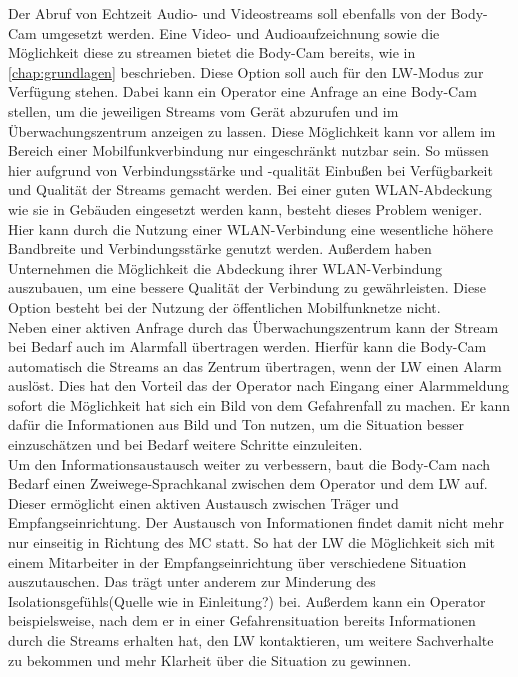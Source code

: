 \documentclass[thesis.tex]{subfiles}
\begin{document}
Der Abruf von Echtzeit Audio- und Videostreams soll ebenfalls von der Body-Cam umgesetzt werden.
Eine Video- und Audioaufzeichnung sowie die Möglichkeit diese zu streamen bietet die Body-Cam bereits, wie in \autoref{chap:grundlagen} beschrieben.
Diese Option soll auch für den LW-Modus zur Verfügung stehen.
Dabei kann ein Operator eine Anfrage an eine Body-Cam stellen, um die jeweiligen Streams vom Gerät abzurufen und im Überwachungszentrum anzeigen zu lassen.
Diese Möglichkeit kann vor allem im Bereich einer Mobilfunkverbindung nur eingeschränkt nutzbar sein.
So müssen hier aufgrund von Verbindungsstärke und -qualität Einbußen bei Verfügbarkeit und Qualität der Streams gemacht werden.
Bei einer guten WLAN-Abdeckung wie sie in Gebäuden eingesetzt werden kann, besteht dieses Problem weniger.
Hier kann durch die Nutzung einer WLAN-Verbindung eine wesentliche höhere Bandbreite und Verbindungsstärke genutzt werden.
Außerdem haben Unternehmen die Möglichkeit die Abdeckung ihrer WLAN-Verbindung auszubauen, um eine bessere Qualität der Verbindung zu gewährleisten.
Diese Option besteht bei der Nutzung der öffentlichen Mobilfunknetze nicht.
\\

Neben einer aktiven Anfrage durch das Überwachungszentrum kann der Stream bei Bedarf auch im Alarmfall übertragen werden.
Hierfür kann die Body-Cam automatisch die Streams an das Zentrum übertragen, wenn der LW einen Alarm auslöst.
Dies hat den Vorteil das der Operator nach Eingang einer Alarmmeldung sofort die Möglichkeit hat sich ein Bild von dem Gefahrenfall zu machen.
Er kann dafür die Informationen aus Bild und Ton nutzen, um die Situation besser einzuschätzen und bei Bedarf weitere Schritte einzuleiten.
\\

Um den Informationsaustausch weiter zu verbessern, baut die Body-Cam nach Bedarf einen Zweiwege-Sprachkanal zwischen dem Operator und dem LW auf.
Dieser ermöglicht einen aktiven Austausch zwischen Träger und Empfangseinrichtung.
Der Austausch von Informationen findet damit nicht mehr nur einseitig in Richtung des MC statt.
So hat der LW die Möglichkeit sich mit einem Mitarbeiter in der Empfangseinrichtung über verschiedene Situation auszutauschen.
Das trägt unter anderem zur Minderung des Isolationsgefühls(Quelle wie in Einleitung?) bei.
Außerdem kann ein Operator beispielsweise, nach dem er in einer Gefahrensituation bereits Informationen durch die Streams erhalten hat, den LW kontaktieren, um weitere Sachverhalte zu bekommen und mehr Klarheit über die Situation zu gewinnen.
\\
\end{document}
